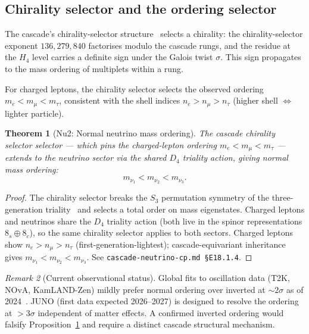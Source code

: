 \documentclass[12pt]{article}
\newtheorem{theorem}{Theorem}
\theoremstyle{definition}
\theoremstyle{remark}
\newtheorem{remark}[theorem]{Remark}
\begin{document}
\subsection{Chirality selector and the ordering selector}

The cascade's chirality-selector structure~\citep{SmartXXXI, GodPrime2024} selects a chirality: the chirality-selector exponent $136{,}279{,}840$ factorises modulo the cascade rungs, and the residue at the $H_4$ level carries a definite sign under the Galois twist $\sigma$. This sign propagates to the mass ordering of multiplets within a rung.

For charged leptons, the chirality selector selects the observed ordering $m_e < m_\mu < m_\tau$, consistent with the shell indices $n_e > n_\mu > n_\tau$ (higher shell $\Leftrightarrow$ lighter particle).

\begin{theorem}[Nu2: Normal neutrino mass ordering]\label{prop:ordering}
The cascade chirality selector selector --- which pins the charged-lepton ordering $m_e < m_\mu < m_\tau$ --- extends to the neutrino sector via the shared $D_4$ triality action, giving \emph{normal} mass ordering:
\begin{equation}
m_{\nu_1} < m_{\nu_2} < m_{\nu_3}.
\end{equation}
\end{theorem}

\begin{proof}
The chirality selector breaks the $S_3$ permutation symmetry of the three-generation triality~\citep{SmartXXII} and selects a total order on mass eigenstates. Charged leptons and neutrinos share the $D_4$ triality action (both live in the spinor representations $8_s \oplus 8_c$), so the same chirality selector applies to both sectors. Charged leptons show $n_e > n_\mu > n_\tau$ (first-generation-lightest); cascade-equivariant inheritance gives $m_{\nu_1} < m_{\nu_2} < m_{\nu_3}$. See \texttt{cascade-neutrino-cp.md §E18.1.4}.
\end{proof}

\begin{remark}[Current observational status]
Global fits to oscillation data (T2K, NOvA, KamLAND-Zen) mildly prefer normal ordering over inverted at $\sim 2\sigma$ as of 2024~\citep{PDG2024}. JUNO (first data expected 2026--2027) is designed to resolve the ordering at $> 3\sigma$ independent of matter effects. A confirmed inverted ordering would falsify Proposition~\ref{prop:ordering} and require a distinct cascade structural mechanism.
\end{remark}
\end{document}
